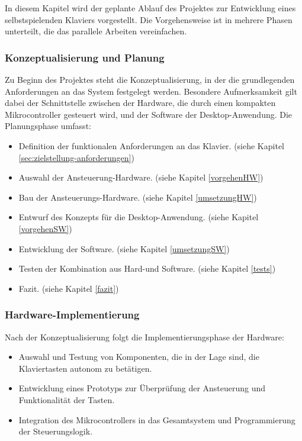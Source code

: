In diesem Kapitel wird der geplante Ablauf des Projektes zur Entwicklung eines selbstspielenden Klaviers vorgestellt.
Die Vorgehensweise ist in mehrere Phasen unterteilt, die das parallele Arbeiten vereinfachen.

\subsubsection{Konzeptualisierung und Planung}\label{Vorgehensweise - Konzeptualisierung und Planung}

Zu Beginn des Projektes steht die Konzeptualisierung, in der die grundlegenden Anforderungen an das System festgelegt werden.
Besondere Aufmerksamkeit gilt dabei der Schnittstelle zwischen der Hardware, die durch einen kompakten Mikrocontroller gesteuert wird, und der Software der Desktop-Anwendung.
Die Planungsphase umfasst:

\begin{itemize}
    \item Definition der funktionalen Anforderungen an das Klavier. (siehe Kapitel \ref{sec:zielstellung-anforderungen})
    \item Auswahl der Ansteuerung-Hardware. (siehe Kapitel \ref{vorgehenHW})
    \item Bau der Ansteuerungs-Hardware. (siehe Kapitel \ref{umsetzungHW})
    \item Entwurf des Konzepts für die Desktop-Anwendung. (siehe Kapitel \ref{vorgehenSW})
    \item Entwicklung der Software. (siehe Kapitel \ref{umsetzungSW})
    \item Testen der Kombination aus Hard-und Software. (siehe Kapitel \ref{tests})
    \item Fazit. (siehe Kapitel \ref{fazit})
\end{itemize}

\subsubsection{Hardware-Implementierung}\label{Vorgehensweise - Hardware-Implementierung}

Nach der Konzeptualisierung folgt die Implementierungsphase der Hardware:

\begin{itemize}
    \item Auswahl und Testung von Komponenten, die in der Lage sind, die Klaviertasten autonom zu betätigen.
    \item Entwicklung eines Prototyps zur Überprüfung der Ansteuerung und Funktionalität der Tasten.
    \item Integration des Mikrocontrollers in das Gesamtsystem und Programmierung der Steuerungslogik.
\end{itemize}

